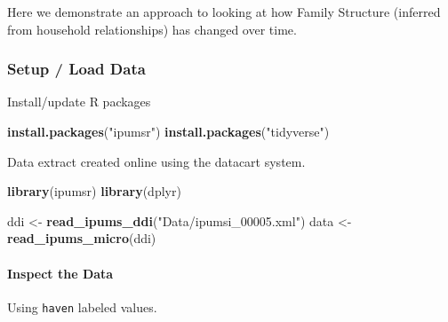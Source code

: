 \documentclass[
]{book}
\newenvironment{Shaded}{\begin{snugshade}}{\end{snugshade}}
\newcommand{\DecValTok}[1]{\textcolor[rgb]{0.00,0.00,0.81}{#1}}
\newcommand{\KeywordTok}[1]{\textcolor[rgb]{0.13,0.29,0.53}{\textbf{#1}}}
\newcommand{\NormalTok}[1]{#1}
\newcommand{\OperatorTok}[1]{\textcolor[rgb]{0.81,0.36,0.00}{\textbf{#1}}}
\newcommand{\StringTok}[1]{\textcolor[rgb]{0.31,0.60,0.02}{#1}}
\begin{document}
Here we demonstrate an approach to looking at how Family Structure (inferred from household relationships) has changed over time.

\hypertarget{setup-load-data}{%
\subsubsection{Setup / Load Data}\label{setup-load-data}}

Install/update R packages

\begin{Shaded}
\begin{Highlighting}[]
\KeywordTok{install.packages}\NormalTok{(}\StringTok{"ipumsr"}\NormalTok{)}
\KeywordTok{install.packages}\NormalTok{(}\StringTok{"tidyverse"}\NormalTok{)}
\end{Highlighting}
\end{Shaded}

Data extract created online using the datacart system.

\begin{Shaded}
\begin{Highlighting}[]
\KeywordTok{library}\NormalTok{(ipumsr)}
\KeywordTok{library}\NormalTok{(dplyr)}


\NormalTok{ddi <-}\StringTok{ }\KeywordTok{read_ipums_ddi}\NormalTok{(}\StringTok{"Data/ipumsi_00005.xml"}\NormalTok{)}
\NormalTok{data <-}\StringTok{ }\KeywordTok{read_ipums_micro}\NormalTok{(ddi)}
\end{Highlighting}
\end{Shaded}

\hypertarget{inspect-the-data}{%
\paragraph{Inspect the Data}\label{inspect-the-data}}

Using \texttt{haven} labeled values.

\begin{Shaded}
\end{Shaded}
\end{document}
